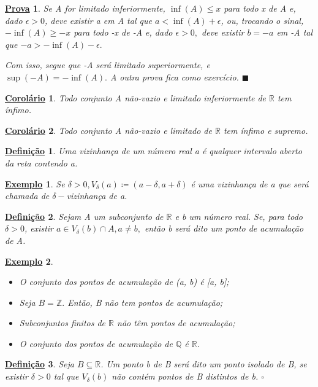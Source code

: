 \documentclass{article}
\newtheorem*{def*}{\underline{Defini\c c\~ao}}
\newtheorem{example}{\underline{Exemplo}}
\newtheorem*{proof*}{\underline{Prova}}
\newtheorem*{crl*}{\underline{Corol\'ario}}
\renewcommand\qedsymbol{$\blacksquare$}
\begin{document}
\begin{proof*}
  Se A for limitado inferiormente, $\inf{(A)} \leq{x}$ para todo x de A e, dado $\epsilon > 0$, deve existir a em A tal que
  $a < \inf{(A)} + \epsilon$, ou, trocando o sinal, $-\inf{(A)} \geq{-x}$ para todo -x de -A e, dado $\epsilon > 0,$ deve existir
  $b = -a$ em -A tal que $-a > -\inf{(A)} - \epsilon.$

  Com isso, segue que -A ser\'a limitado superiormente, e $\sup{(-A)} = -\inf{(A)}.$ A outra prova fica como exerc\'icio. \qedsymbol
\end{proof*}
\begin{crl*}
  Todo conjunto A n\~ao-vazio e limitado inferiormente de $\mathbb{R}$ tem \'infimo.
\end{crl*}
\begin{crl*}
  Todo conjunto A n\~ao-vazio e limitado de $\mathbb{R}$ tem \'infimo e supremo.
\end{crl*}
\begin{def*}
  Uma vizinhan\c ca de um n\'umero real a \'e qualquer intervalo aberto da reta contendo a.
\end{def*}
\begin{example}
  Se $\delta > 0, V_{\delta}(a)\coloneqq(a - \delta, a + \delta)$ \'e uma vizinhan\c ca de a que ser\'a chamada de $\delta-$vizinhan\c ca de a. 
\end{example}
\begin{def*}
  Sejam A um subconjunto de $\mathbb{R}$ e b um n\'umero real. Se, para todo $\delta > 0$, existir $a\in V_{\delta}(b)\cap{A}, a\neq b,$ 
ent\~ao b ser\'a dito um ponto de acumula\c c\~ao de A.
\end{def*}
\begin{example}
 \begin{itemize}
   \item[a)]O conjunto dos pontos de acumula\c c\~ao de (a, b) \'e [a, b];
    \item[b)]Seja $B = \mathbb{Z}.$ Ent\~ao, B n\~ao tem pontos de acumula\c c\~ao; 
      \item[c)] Subconjuntos finitos de $\mathbb{R}$ n\~ao t\^em pontos de acumula\c c\~ao;
        \item[d)] O conjunto dos pontos de acumula\c c\~ao de $\mathbb{Q}$ \'e $\mathbb{R}$.
 \end{itemize}
\end{example}
\begin{def*}
  Seja $B\subseteq{\mathbb{R}}$. Um ponto b de B ser\'a dito um ponto isolado de B, se existir $\delta > 0$ tal que $V_{\delta}(b)$
n\~ao cont\'em pontos de B distintos de b. $\square$
\end{def*}
\end{document}
